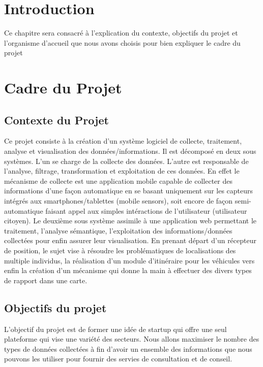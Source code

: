 \section*{Introduction}

Ce chapitre sera consacré à l'explication du contexte, objectifs du projet et
l'organisme d'accueil que nous avons choisis pour bien expliquer le cadre du
projet

\section{Cadre du Projet}

\subsection{Contexte du Projet}

Ce projet consiste à la création d’un système logiciel de collecte, traitement,
analyse et visualisation des données/informations. Il est décomposé en deux
sous systèmes. L’un se charge de la collecte des données. L’autre est
responsable de l'analyse, filtrage, transformation et exploitation de ces
données. En effet le mécanisme de collecte est une application mobile capable
de collecter des informations d’une façon automatique en se basant uniquement
sur les capteurs intégrés aux smartphones/tablettes (mobile sensors), soit
encore de façon semi-automatique faisant appel aux simples intéractions de
l’utilisateur (utilisateur citoyen). Le deuxième sous système assimile à une
application web permettant le traitement, l’analyse sémantique, l'exploitation
des informations/données collectées pour enfin assurer leur visualisation. En
prenant départ d’un récepteur de position, le sujet vise à résoudre les
problématiques de localisations des multiple individus, la réalisation d’un
module d’itinéraire pour les véhicules vers enfin la création d’un mécanisme
qui donne la main à effectuer des divers types de rapport dans une carte.

\subsection{Objectifs du projet}

L'objectif du projet est de former une idée de startup qui offre une seul
plateforme qui vise une variété des secteurs. Nous allons maximiser le nombre
des types de données collectées à fin d'avoir un ensemble des informations que
nous pouvons les utiliser pour fournir des servies de consultation et de
conseil.

